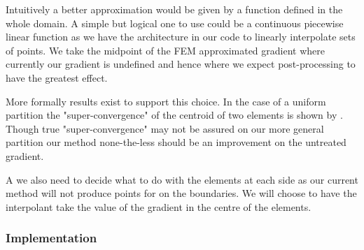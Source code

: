 \documentclass{uonmathreport}
\theoremstyle{definition}
\theoremstyle{problem}
\theoremstyle{theorem}
\begin{document}
{\begin{center}
\end{center}

Intuitively a better approximation would be given by a function defined in the whole domain. A simple but logical one to use could be a continuous piecewise linear function as we have the architecture in our code to linearly interpolate sets of points. We take the midpoint of the FEM approximated gradient where currently our gradient is undefined and hence where we expect post-processing to have the greatest effect. 

More formally results exist to support this choice. In the case of a uniform partition the "super-convergence" of the centroid of two elements is shown by \cite{zlamal1978superconvergence}. Though true "super-convergence" may not be assured on our more general partition our method none-the-less should be an improvement on the untreated gradient. 

A we also need to decide what to do with the elements at each side as our current method will not produce points for on the boundaries. We will choose to have the interpolant take the value of the gradient in the centre of the elements.



\begin{center}
\end{center}

\subsubsection{Implementation} \label{subsubsec:KK Implementation}

}
\end{document}
